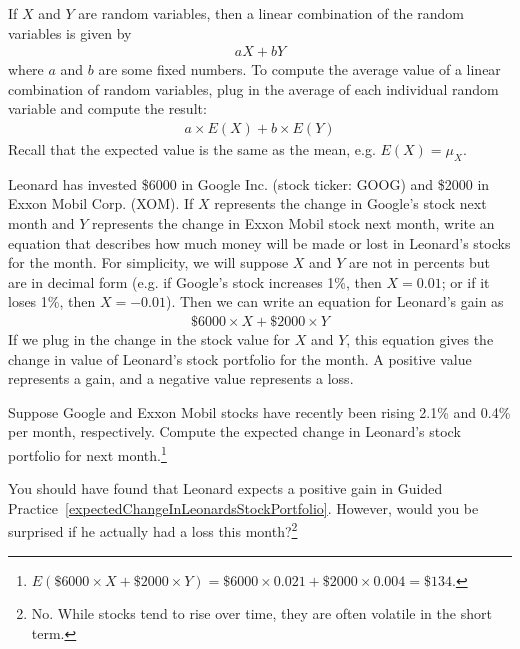 \begin{termBox}{
If $X$ and $Y$ are random variables, then a linear combination of the random variables is given by
\begin{align}\label{linComboOfRandomVariablesXAndY}
aX + bY
\end{align}
where $a$ and $b$ are some fixed numbers. To compute the average value of a linear combination of random variables, plug in the average of each individual random variable and compute the result:
\begin{align*}
a\times E(X) + b\times E(Y)
\end{align*}
Recall that the expected value is the same as the mean, e.g. $E(X) = \mu_X$.}
\end{termBox}

\begin{example}{Leonard has invested \$6000 in Google Inc. (stock ticker: GOOG) and \$2000 in Exxon Mobil Corp. (XOM). If $X$ represents the change in Google's stock next month and $Y$ represents the change in Exxon Mobil stock next month, write an equation that describes how much money will be made or lost in Leonard's stocks for the month.}
For simplicity, we will suppose $X$ and $Y$ are not in percents but are in decimal form (e.g. if Google's stock increases 1\%, then $X=0.01$; or if it loses 1\%, then $X=-0.01$). Then we can write an equation for Leonard's gain as
\begin{align*}
\$6000\times X + \$2000\times Y
\end{align*}
If we plug in the change in the stock value for $X$ and $Y$, this equation gives the change in value of Leonard's stock portfolio for the month. A positive value represents a gain, and a negative value represents a loss.
\end{example}

\begin{exercise}\label{expectedChangeInLeonardsStockPortfolio}
Suppose Google and Exxon Mobil stocks have recently been rising 2.1\% and 0.4\% per month, respectively. Compute the expected change in Leonard's stock portfolio for next month.\footnote{$E(\$6000\times X + \$2000\times Y) = \$6000\times 0.021 + \$2000\times 0.004 = \$134$.}
\end{exercise}

\begin{exercise}
You should have found that Leonard expects a positive gain in Guided Practice~\ref{expectedChangeInLeonardsStockPortfolio}. However, would you be surprised if he actually had a loss this month?\footnote{No. While stocks tend to rise over time, they are often volatile in the short term.}
\end{exercise}

